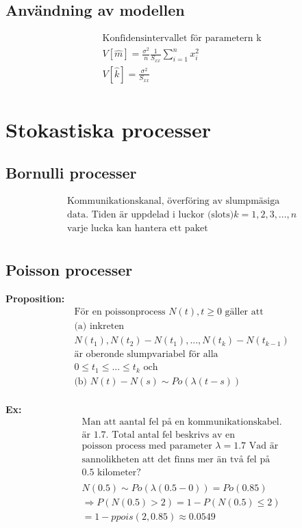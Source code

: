 \begin{multicols}{2}
\subsection{Användning av modellen}
\begin{align*}
  &\text{Konfidensintervallet för parametern k} \\
  &V[\hat{m}]=\frac{\sigma^2}{n}\frac{1}{S_{xx}} \sum_{i=1}^{n}x^2_i \\
  &V[\hat{k}]=\frac{\sigma^2}{S_{xx}} \\
\end{align*}

\section{Stokastiska processer}
\subsection{Bornulli processer}
\begin{align*}
  &\text{Kommunikationskanal, överföring av slumpmäsiga} \\
  &\text{data. Tiden är uppdelad i luckor (slots)} k=1,2,3,...,n \\
  &\text{varje lucka kan hantera ett paket} \\
\end{align*}

\subsection{Poisson processer}
\textbf{Proposition:}
\begin{align*}
  &\text{För en poissonprocess $N(t), t \geq 0$ gäller att } \\
  &\text{(a) inkreten} \\
  &N(t_1),N(t_2)-N(t_1),...,N(t_k)-N(t_{k-1}) \\
  &\text{är oberonde slumpvariabel för alla} \\
  &0\leq t_1 \leq ... \leq t_k \text{ och} \\
  &\text{(b) } N(t) - N(s) \sim Po(\lambda(t-s)) \\
\end{align*}

\textbf{Ex:}
\begin{align*}
  &\text{Man att aantal fel på en kommunikationskabel.} \\
  &\text{är $1.7$. Total antal fel beskrivs av en} \\
  &\text{poisson process med parameter $\lambda=1.7$ Vad är} \\
  &\text{sannolikheten att det finns mer än två fel på} \\
  &\text{$0.5$ kilometer?} \\
  &\\
  &N(0.5)\sim Po(\lambda(0.5-0))=Po(0.85) \\
  &\Rightarrow P(N(0.5)>2) = 1-P(N(0.5)\leq2) \\
  &= 1-ppois(2, 0.85) \approx 0.0549 \\
\end{align*}


\end{multicols}
